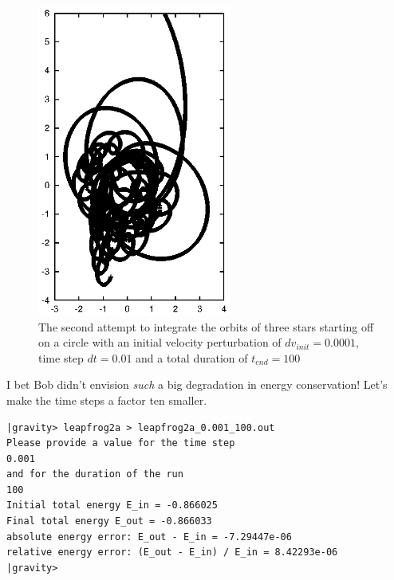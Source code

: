 \begin{figure}[htb]
\centering
\includegraphics[width=2.5in]{chap5/leapfrog2a_0.01_100.ps}
\caption[Three stars on a circle, leapfrog, $dv_{init}=0.0001$, $dt = 0.01$,
$t_{end} = 100$]
{The second attempt to integrate the orbits of three stars
starting off on a circle with an initial velocity perturbation of 
$dv_{init}=0.0001$, time step $dt = 0.01$ and a total duration of
$t_{end} = 100$}
\label{fig:leap2a-0.01-100}
\end{figure}

\abc

\carol
I bet Bob didn't envision {\it such} a big degradation in energy
conservation!  Let's make the time steps a factor ten smaller.

\cba

\begin{small}
\begin{verbatim}
|gravity> leapfrog2a > leapfrog2a_0.001_100.out
Please provide a value for the time step
0.001
and for the duration of the run
100
Initial total energy E_in = -0.866025
Final total energy E_out = -0.866033
absolute energy error: E_out - E_in = -7.29447e-06
relative energy error: (E_out - E_in) / E_in = 8.42293e-06
|gravity>
\end{verbatim}
\end{small}


